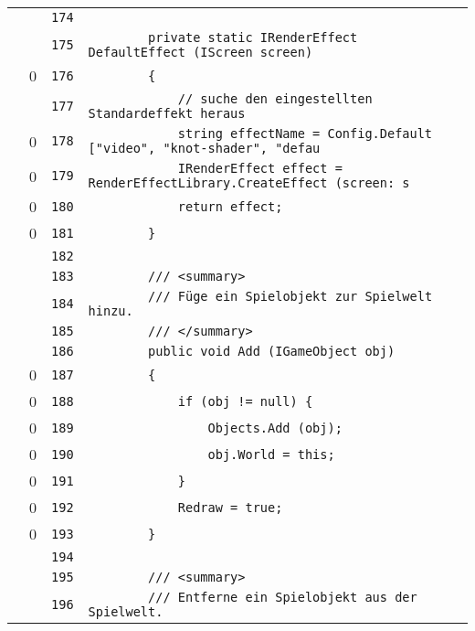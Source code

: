 \documentclass[a4paper,10pt]{article}
\begin{document}
\begin{longtable}[l]{lrrl}
\cellcolor{gray} &  & \verb~174~ & \verb~~\\
\cellcolor{gray} &  & \verb~175~ & \verb~        private static IRenderEffect DefaultEffect (IScreen screen)~\\
\cellcolor{red} & 0 & \verb~176~ & \verb~        {~\\
\cellcolor{gray} &  & \verb~177~ & \verb~            // suche den eingestellten Standardeffekt heraus~\\
\cellcolor{red} & 0 & \verb~178~ & \verb~            string effectName = Config.Default ["video", "knot-shader", "defau~\\
\cellcolor{red} & 0 & \verb~179~ & \verb~            IRenderEffect effect = RenderEffectLibrary.CreateEffect (screen: s~\\
\cellcolor{red} & 0 & \verb~180~ & \verb~            return effect;~\\
\cellcolor{red} & 0 & \verb~181~ & \verb~        }~\\
\cellcolor{gray} &  & \verb~182~ & \verb~~\\
\cellcolor{gray} &  & \verb~183~ & \verb~        /// <summary>~\\
\cellcolor{gray} &  & \verb~184~ & \verb~        /// Füge ein Spielobjekt zur Spielwelt hinzu.~\\
\cellcolor{gray} &  & \verb~185~ & \verb~        /// </summary>~\\
\cellcolor{gray} &  & \verb~186~ & \verb~        public void Add (IGameObject obj)~\\
\cellcolor{red} & 0 & \verb~187~ & \verb~        {~\\
\cellcolor{red} & 0 & \verb~188~ & \verb~            if (obj != null) {~\\
\cellcolor{red} & 0 & \verb~189~ & \verb~                Objects.Add (obj);~\\
\cellcolor{red} & 0 & \verb~190~ & \verb~                obj.World = this;~\\
\cellcolor{red} & 0 & \verb~191~ & \verb~            }~\\
\cellcolor{red} & 0 & \verb~192~ & \verb~            Redraw = true;~\\
\cellcolor{red} & 0 & \verb~193~ & \verb~        }~\\
\cellcolor{gray} &  & \verb~194~ & \verb~~\\
\cellcolor{gray} &  & \verb~195~ & \verb~        /// <summary>~\\
\cellcolor{gray} &  & \verb~196~ & \verb~        /// Entferne ein Spielobjekt aus der Spielwelt.~\\

\end{longtable}
\end{document}
